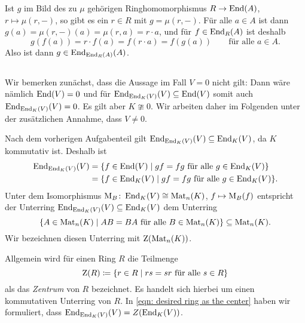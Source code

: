 \documentclass[a4paper, 10pt, numbers=noenddot]{scrartcl}
\begin{document}
Ist $g$ im Bild des zu $\mu$ gehörigen Ringhomomorphismus $R \to \operatorname{End}(A)$, $r \mapsto \mu(r, -)$, so gibt es ein $r \in R$ mit $g = \mu(r, -)$.
Für alle $a \in A$ ist dann $g(a) = \mu(r,-)(a) = \mu(r,a) = r \cdot a$, und für $f \in \operatorname{End}_R(A)$ ist deshalb
\[
    g(f(a))
  = r \cdot f(a)
  = f(r \cdot a)
  = f(g(a))
  \qquad
  \text{für alle $a \in A$}.
\]
Also ist dann $g \in \operatorname{End}_{\operatorname{End}_R(A)}(A)$.





\subsection{}

Wir bemerken zunächst, dass die Aussage im Fall $V = 0$ nicht gilt:
Dann wäre nämlich $\operatorname{End}(V) = 0$ und für $\operatorname{End}_{\operatorname{End}_K(V)}(V) \subseteq \operatorname{End}(V)$ somit auch $\operatorname{End}_{\operatorname{End}_K(V)}(V) = 0$.
Es gilt aber $K \ncong 0$.
Wir arbeiten daher im Folgenden unter der zusätzlichen Annahme, dass $V \neq 0$.

Nach dem vorherigen Aufgabenteil gilt $\operatorname{End}_{\operatorname{End}_K(V)}(V) \subseteq \operatorname{End}_K(V)$, da $K$ kommutativ ist.
Deshalb ist
\begin{equation}
  \label{eqn: desired ring as the center}
  \begin{aligned}
        \operatorname{End}_{\operatorname{End}_K(V)}(V)
    &=  \{
          f \in \operatorname{End}(V)
        \mid
          \text{$gf = fg$ für alle $g \in \operatorname{End}_K(V)$}
        \}
    \\
    &=  \{
          f \in \operatorname{End}_K(V)
        \mid
          \text{$gf = fg$ für alle $g \in \operatorname{End}_K(V)$}
        \}.
  \end{aligned}
\end{equation}
Unter dem Isomorphismus $\operatorname{M}_B \colon \operatorname{End}_K(V) \cong \operatorname{Mat}_n(K)$, $f \mapsto \operatorname{M}_B(f)$ entspricht der Unterring $\operatorname{End}_{\operatorname{End}_K(V)}(V) \subseteq \operatorname{End}_K(V)$ dem Unterring
\[
            \{
              A \in \operatorname{Mat}_n(K)
            \mid
              \text{$AB = BA$ für alle $B \in \operatorname{Mat}_n(K)$}
            \}
  \subseteq \operatorname{Mat}_n(K).
\]
Wir bezeichnen diesen Unterring mit $\operatorname{Z}(\operatorname{Mat}_n(K))$.

\begin{remark}
  Allgemein wird für einen Ring $R$ die Teilmenge
  \[
              \operatorname{Z}(R)
    \coloneqq \{ r \in R \mid \text{$rs = sr$ für alle $s \in R$} \}
  \]
  als das \emph{Zentrum} von $R$ bezeichnet.
  Es handelt sich hierbei um einen kommutativen Unterring von $R$.
  In \eqref{eqn: desired ring as the center} haben wir formuliert, dass $\operatorname{End}_{\operatorname{End}_K(V)}(V) = Z(\operatorname{End}_K(V))$.
\end{remark}
\end{document}
